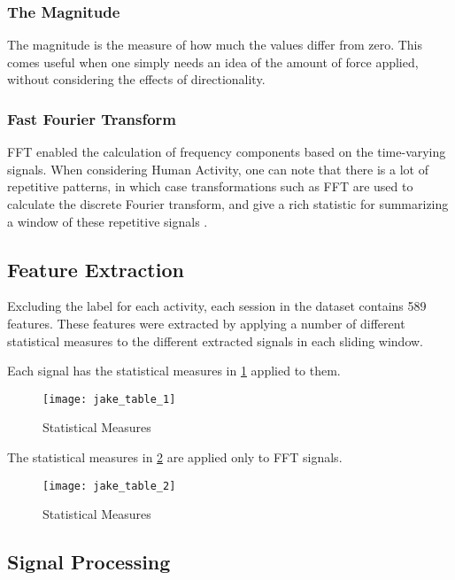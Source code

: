 \subsubsection{The Magnitude}
The magnitude is the measure of how much the values differ from zero. This comes useful when one simply needs an idea of the amount of force applied, without considering the effects of directionality.

\subsubsection{Fast Fourier Transform}
FFT enabled the calculation of frequency components based on the time-varying signals. When considering Human Activity, one can note that there is a lot of repetitive patterns, in which case transformations such as FFT are used to calculate the discrete Fourier transform, and give a
rich statistic for summarizing a window of these repetitive signals \cite{SousaLima2019}.

\subsection{Feature Extraction}
    Excluding the label for each activity, each session in the dataset contains 589 features. These features were extracted by applying a number of different statistical
    measures to the different extracted signals in each sliding window.

    Each signal has the statistical measures in \ref{fig:features_table1} applied to them.

    \begin{figure}[H]
        \centering
        \texttt{[image: jake\_table\_1]}\hfill
        \caption{Statistical Measures}
    \label{fig:features_table1}
    \end{figure}

    The statistical measures in \ref{fig:features_table2} are applied only to FFT signals.

    \begin{figure}[H]
        \centering
        \texttt{[image: jake\_table\_2]}\hfill
        \caption{Statistical Measures}
    \label{fig:features_table2}
    \end{figure}

\subsection{Signal Processing}

